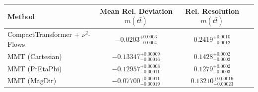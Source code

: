     \begin{tabular}{lccc}
        \toprule
        Method & Mean Rel. Deviation $m(t\bar{t})$ & Rel. Resolution $m(t\bar{t})$ \\
        \midrule
        CompactTransformer + $\nu^2$-Flows & $-0.0203^{+0.0003}_{-0.0004}$ & $0.2419^{+0.0010}_{-0.0012}$ \\
        MMT (Cartesian) & $-0.13347^{+0.00009}_{-0.00016}$ & $0.1428^{+0.0002}_{-0.0003}$ \\
        MMT (PtEtaPhi) & $-0.12957^{+0.00008}_{-0.00011}$ & $0.1279^{+0.0002}_{-0.0003}$ \\
        MMT (MagDir) & $-0.07700^{+0.00011}_{-0.00019}$ & $0.13210^{+0.00016}_{-0.00023}$ \\
        \bottomrule
    \end{tabular}